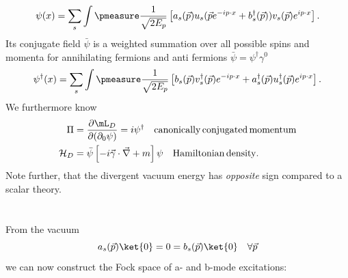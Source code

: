 \begin{equation}
		\psi(x) = \sum_s \int \pmeasure \frac{1}{\sqrt{2E_p}} \left[a_s(\vec{p})u_s(\vec{p} e^{-ip\cdot x} + b^{\dagger}_s(\vec{p}))v_s(\vec{p}) e^{i p\cdot x}  \right].
\end{equation}
Its conjugate field $\bar{\psi}$ is a weighted summation over all possible spins and momenta for annihilating fermions and anti fermions $\bar{\psi}=\psi^{\dagger} \gamma^0$
\begin{equation}
	\psi^{\dagger} (x) = \sum_s \int \pmeasure \frac{1}{\sqrt{2 E_p}} \left[b_s(\vec{p})v^{\dagger}_s(\vec{p})e^{-i p\cdot x} + a^{\dagger}_s(\vec{p}) u^{\dagger}_s(\vec{p}) e^{i p\cdot x} \right].
\end{equation}
We furthermore know
\begin{align}
	\Pi &= \frac{\partial \mL_D}{\partial(\partial_0 \psi)} = i \psi^{\dagger} \quad \mathrm{canonically \, conjugated\, momentum}\\
	\mathcal{H}_D &= \bar{\psi} \left[- i \vec{\gamma} \cdot \vec{\nabla} +m\right] \psi \quad \mathrm{Hamiltonian\, density}.
\end{align}
Note further, that the divergent vacuum energy has \emph{opposite} sign compared to a scalar theory.\\
\\
\\
From the vacuum 
\begin{equation}
	a_s(\vec{p})\ket{0} = 0 = b_s(\vec{p}) \ket{0} \quad \forall \vec{p}
\end{equation}
we can now construct the Fock space of a- and b-mode excitations:
